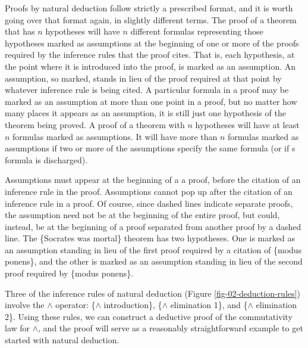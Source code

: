 Proofs by natural deduction follow strictly a prescribed format,
and it is worth going over that format again, in slightly different terms.
The proof of a theorem that has
$n$ hypotheses will have $n$ different
formulas representing those hypotheses
marked as assumptions
at the beginning of one or more of the proofs
required by the inference rules that the proof cites.
That is, each hypothesis, at the point where it is introduced
into the proof, is marked as an assumption.
An assumption, so marked, stands in lieu of the proof
required at that point by whatever inference rule is being cited.
A particular formula in a proof may be marked as an assumption
at more than one point in a proof, but no matter how many places
it appears as an assumption, it is still just
one hypothesis of the theorem being proved.
A proof of a theorem with $n$ hypotheses will have at least $n$
formulas marked as assumptions.
It will have more than $n$ formulas marked as assumptions
if two or more of the assumptions specify the same formula
(or if s formula is discharged).

Assumptions must appear at the beginning of a
a proof, before the citation of an
inference rule in the proof.
Assumptions cannot pop up after the citation
of an inference rule in a proof.
Of course, since dashed lines indicate separate proofs,
the assumption need not be at the beginning of the entire
proof, but could, instead, be at the beginning of
a proof separated from another proof by a dashed line.
The \{Socrates was mortal\} theorem has two hypotheses.
One is marked as an assumption standing in lieu of the first proof
required by a citation of \{modus ponens\},
and the other is marked as an assumption
standing in lieu of the second proof
required by \{modus ponens\}.

Three of the inference rules of natural deduction
(Figure \ref{fig-02-deduction-rules})
involve the $\wedge$ operator:
\{$\wedge$ introduction\},
\{$\wedge$ elimination 1\}, and
\{$\wedge$ elimination 2\}.
Using these rules, we can construct a deductive proof
of the commutativity law for $\wedge$,
and the proof will serve as a reasonably straightforward
example to get started with natural deduction.

